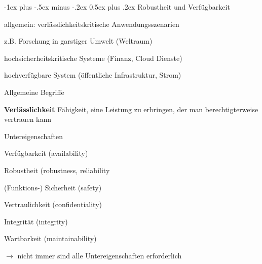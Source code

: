 \documentclass[a4paper]{article}
\makeatletter
\renewcommand{\section}{\@startsection{section}{1}{0mm}%
 {-1ex plus -.5ex minus -.2ex}%
 {0.5ex plus .2ex}%
 {\normalfont\large\bfseries}}
\makeatother
\begin{document}
\begin{multicols}{3}
    \pagebreak
    \pagebreak
    \section{Robustheit und Verfügbarkeit}
    \begin{itemize*}
        \item allgemein: verlässlichkeitskritische Anwendungsszenarien
        \item z.B. Forschung in garstiger Umwelt (Weltraum)
        \item hochsicherheitskritische Systeme (Finanz, Cloud Dienste)
        \item hochverfügbare System (öffentliche Infrastruktur, Strom)
    \end{itemize*}

    Allgemeine Begriffe
    \begin{itemize*}
        \item \textbf{Verlässlichkeit} Fähigkeit, eine Leistung zu erbringen, der man berechtigterweise vertrauen kann
        \item Untereigenschaften
        \begin{enumerate*}
            \item Verfügbarkeit (availability)
            \item Robustheit (robustness, reliability
            \item (Funktions-) Sicherheit (safety)
            \item Vertraulichkeit (confidentiality)
            \item Integrität (integrity)
            \item Wartbarkeit (maintainability)
        \end{enumerate*}
        \item[$\rightarrow$] nicht immer sind alle Untereigenschaften erforderlich
    \end{itemize*}


\end{multicols}
\end{document}
